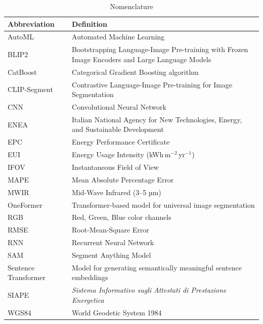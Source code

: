\documentclass[preprint,12pt]{elsarticle}
\begin{document}
\begin{table}[htbp]
  \centering
  \caption{Nomenclature}
  \begin{tabularx}{\textwidth}{@{}lX@{}}
    \toprule
    \textbf{Abbreviation} & \textbf{Definition} \\ \midrule
    AutoML & Automated Machine Learning \\[0.4em]
    BLIP2 & Bootstrapping Language-Image Pre-training with Frozen Image Encoders and Large Language Models \\[0.4em]
    CatBoost & Categorical Gradient Boosting algorithm \\[0.4em]
    CLIP-Segment & Contrastive Language-Image Pre-training for Image Segmentation \\[0.4em]
    CNN   & Convolutional Neural Network \\[0.4em]
    ENEA  & Italian National Agency for New Technologies, Energy, and Sustainable Development \\[0.4em]
    EPC   & Energy Performance Certificate \\[0.4em]
    EUI   & Energy Usage Intensity (kWh\,m$^{-2}$\,yr$^{-1}$) \\[0.4em]
    IFOV  & Instantaneous Field of View \\[0.4em]
    MAPE  & Mean Absolute Percentage Error \\[0.4em]
    MWIR  & Mid-Wave Infrared (3–5 µm) \\[0.4em]
    OneFormer & Transformer-based model for universal image segmentation \\[0.4em]
    RGB   & Red, Green, Blue color channels \\[0.4em]
    RMSE  & Root-Mean-Square Error \\[0.4em]
    RNN   & Recurrent Neural Network \\[0.4em]
    SAM   & Segment Anything Model \\[0.4em]
    Sentence Transformer & Model for generating semantically meaningful sentence embeddings \\[0.4em]
    SIAPE & \textit{Sistema Informativo sugli Attestati di Prestazione Energetica} \\[0.4em]
    WGS84 & World Geodetic System 1984 \\[0.4em]
    \bottomrule
  \end{tabularx}
  \label{tab:nomenclature}
\end{table}
\end{document}

